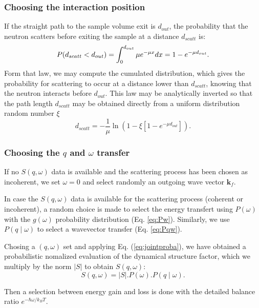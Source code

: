 \subsubsection{Choosing the interaction position}

If the straight path to the sample volume exit is $d_{out}$, the probability that the neutron scatters before exiting the sample at a distance $d_{scatt}$ is:
\begin{equation}
P(d_{scatt} < d_{out}) = \int_0^{d_{out}} \mu e^{-\mu x}dx = 1 - e^{-\mu d_{out}}. \\
\end{equation}
Form that law, we may compute the cumulated distribution, which gives the probability for scattering to occur at a distance lower than $d_{scatt}$, knowing that the neutron interacts before $d_{out}$. This law may be analytically inverted so that the path length $d_{scatt}$ may be obtained directly from a uniform distribution random number $\xi$
\begin{equation}
d_{scatt} = -\frac{1}{\mu} \ln(1 - \xi[1 -e^{-\mu d_{out}}]).
\end{equation}

\subsubsection{Choosing the $q$ and $\omega$ transfer}

If no $S(q, \omega)$ data is available and the scattering process has been chosen as incoherent, we set $\omega=0$ and select randomly an outgoing wave vector $\boldsymbol{k}_f$.

In case the $S(q, \omega)$ data is available for the scattering process (coherent or incoherent), a random choice is made to select the energy transfert using $P(\omega)$ with the $g(\omega)$ probability distribution (Eq. \ref{eq:Pw}).
Similarly, we use $P(q \mid \omega)$ to select a wavevector transfer (Eq. \ref{eq:Pqw}).

Chosing a $(q, \omega)$ set and applying Eq. (\ref{eq:jointproba}), we have obtained a probabilistic nomalized evaluation of the dynamical structure factor, which we multiply by the norm $|S|$ to obtain $S(q, \omega)$:
\begin{equation}
S(q, \omega) = |S|. P(\omega).P(q \mid \omega) .
\end{equation}

Then a selection between energy gain and loss is done with the detailed balance ratio $e^{-\hbar \omega / k_B T}$.

